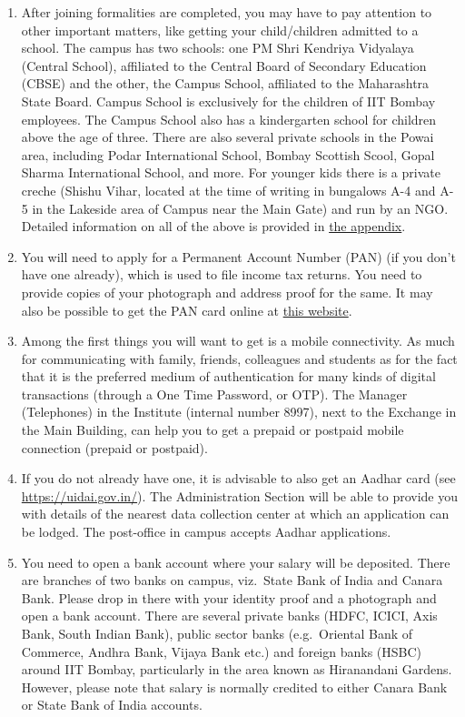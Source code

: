 \documentclass[
  10pt,
  a5paper,
  10pt,
  openany]{amsbook}
\begin{document}
\begin{enumerate}
  salary code number that is needed for all payments and financial
  transactions within the Institute.
\item
  After joining formalities are completed, you may have to pay attention
  to other important matters, like getting your child/children admitted
  to a school. The campus has two schools: one PM Shri Kendriya
  Vidyalaya (Central School), affiliated to the Central Board of
  Secondary Education (CBSE) and the other, the Campus School,
  affiliated to the Maharashtra State Board. Campus School is
  exclusively for the children of IIT Bombay employees. The Campus
  School also has a kindergarten school for children above the age of
  three. There are also several private schools in the Powai area,
  including Podar International School, Bombay Scottish Scool, Gopal
  Sharma International School, and more. For younger kids there is a
  private creche (Shishu Vihar, located at the time of writing in
  bungalows A-4 and A-5 in the Lakeside area of Campus near the Main
  Gate) and run by an NGO. Detailed information on all of the above is
  provided in \hyperref[sec:moreschools]{the appendix}.
\item
  You will need to apply for a Permanent Account Number (PAN) (if you
  don't have one already), which is used to file income tax returns. You
  need to provide copies of your photograph and address proof for the
  same. It may also be possible to get the PAN card online at
  \href{https://www.onlineservices.nsdl.com/paam/endUserRegisterContact.html}{this
  website}.
\item
  Among the first things you will want to get is a mobile connectivity.
  As much for communicating with family, friends, colleagues and
  students as for the fact that it is the preferred medium of
  authentication for many kinds of digital transactions (through a One
  Time Password, or OTP). The Manager (Telephones) in the Institute
  (internal number 8997), next to the Exchange in the Main Building, can
  help you to get a prepaid or postpaid mobile connection (prepaid or
  postpaid).
\item
  If you do not already have one, it is advisable to also get an Aadhar
  card (see \url{https://uidai.gov.in/}). The Administration Section
  will be able to provide you with details of the nearest data
  collection center at which an application can be lodged. The
  post-office in campus accepts Aadhar applications.
\item
  You need to open a bank account where your salary will be deposited.
  There are branches of two banks on campus, viz.~State Bank of India
  and Canara Bank. Please drop in there with your identity proof and a
  photograph and open a bank account. There are several private banks
  (HDFC, ICICI, Axis Bank, South Indian Bank), public sector banks
  (e.g.~Oriental Bank of Commerce, Andhra Bank, Vijaya Bank etc.) and
  foreign banks (HSBC) around IIT Bombay, particularly in the area known
  as Hiranandani Gardens. However, please note that salary is normally
  credited to either Canara Bank or State Bank of India accounts.
\end{enumerate}
\end{document}
